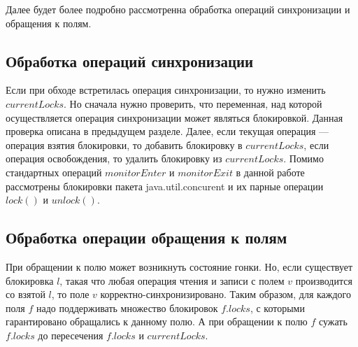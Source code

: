 \FloatBarrier

Далее будет более подробно рассмотренна обработка операций синхронизации и обращения к полям.

\subsection{Обработка операций синхронизации}
Если при обходе встретилась операция синхронизации, то нужно изменить $currentLocks$. Но сначала нужно проверить, что переменная, над которой осуществляется операция синхронизации может являться блокировкой. Данная проверка описана в предыдущем разделе. Далее, если текущая операция --- операция взятия блокировки, то добавить блокировку в $currentLocks$, 
если операция освобождения, то удалить блокировку из $currentLocks$. Помимо стандартных операций $monitorEnter$ и $monitorExit$ в данной работе рассмотрены блокировки пакета java.util.concurent и их парные операции $lock()$ и $unlock()$.

\subsection{Обработка операции обращения к полям}
При обращении к полю может возникнуть состояние гонки. Но, если существует блокировка $l$, такая что любая операция чтения  и записи с полем $v$ производится со взятой $l$, то поле $v$ корректно-синхронизировано. Таким образом, для каждого поля $f$ надо поддерживать множество блокировок $f.locks$, с которыми гарантировано обращались к данному полю. А при обращении к полю $f$ сужать $f.locks$ до пересечения $f.locks$ и $currentLocks$. 


\FloatBarrier
